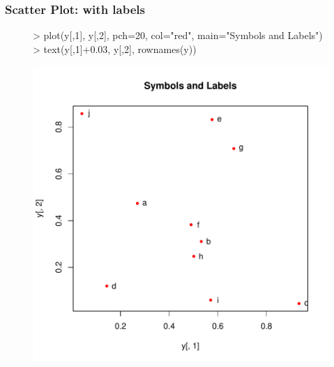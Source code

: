 \documentclass{beamer}
\begin{document}
\begin{frame}[containsverbatim]  
	\frametitle{Scatter Plot: with labels}
\scriptsize
\begin{figure}
  \centering
\begin{Schunk}
\begin{Sinput}
> plot(y[,1], y[,2], pch=20, col="red", main="Symbols and Labels")
> text(y[,1]+0.03, y[,2], rownames(y))
\end{Sinput}
\end{Schunk}
\includegraphics{fig--004}
\label{fig:base_scatter_lab}
\end{figure}
\end{frame}
\end{document}
